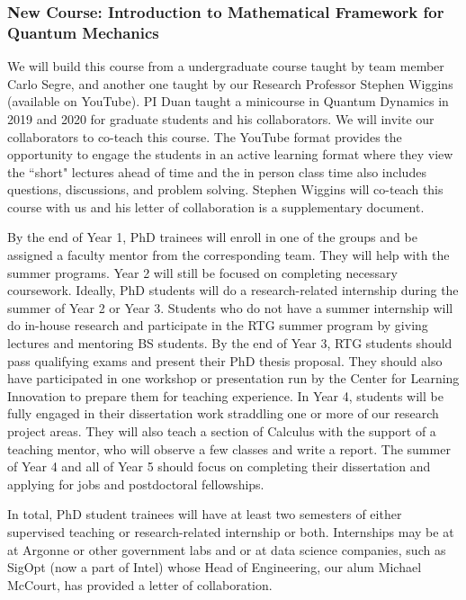 \documentclass[11pt]{NSFamsart}
\begin{document}
\subsubsection*{New Course: Introduction to Mathematical Framework for Quantum Mechanics} We will build this course from  a   undergraduate course   taught by team member Carlo Segre, and another one taught by our Research Professor Stephen Wiggins (available on YouTube). PI Duan   taught a minicourse in Quantum Dynamics \cite{Gutzwiller1990ChaosIC, Holland1993TheQT,Lindgren2019QuantumMC,Micha2006QuantumDW} in 2019 and 2020 for graduate students and his collaborators.  We will invite our collaborators to co-teach this course. 
The YouTube format provides the opportunity to engage the students in an active learning format where they view the “short" lectures ahead of time and the in person class time  also includes  questions, discussions, and problem solving. Stephen Wiggins will co-teach this course with us and his letter of collaboration is a supplementary document.

By the end of Year 1, PhD trainees will enroll in one of the groups and be assigned a faculty mentor from the corresponding team. They will   help with the summer programs.   Year 2
will still be focused on completing necessary coursework.
Ideally, PhD students will do a research-related internship during the summer of Year 2 or Year 3. Students who do not have
a summer internship will do in-house research and participate in the RTG summer program
by giving lectures and mentoring BS students. By the end of Year 3, RTG students
should pass qualifying exams and present their PhD thesis proposal. They should also have participated in one   workshop or presentation run by the Center for Learning Innovation to prepare them for teaching experience. In Year 4, students will be fully engaged in their dissertation work straddling one or more of our research project areas. They will also teach a section of Calculus with the support of a teaching
mentor, who will observe a few classes and write a report. The summer of Year 4 and all of Year 5 should focus on completing their dissertation and applying for jobs and postdoctoral fellowships.

In total, PhD student trainees will have at least two semesters of either supervised teaching or research-related internship or both.  Internships may be at at Argonne or other government labs and or at data science companies, such as SigOpt (now a part of Intel) whose Head of Engineering, our alum Michael McCourt, has provided a letter  of collaboration.
\end{document}
